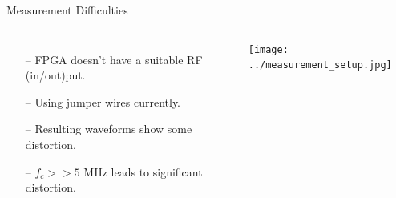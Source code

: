 \documentclass{beamer}
\begin{document}
\begin{frame}{Measurement Difficulties}
\vspace*{-5mm}
\begin{columns}
	\begin{itemize}
		\item[--]
			FPGA doesn't have a suitable RF (in/out)put.
		\item[--]
			Using jumper wires currently.
		\item[--]
			Resulting waveforms show some distortion.
		\item[--]
			$f_c>>5\textrm{ MHz}$ leads to significant distortion.
	\end{itemize}
    \texttt{[image: ../measurement\_setup.jpg]}

\end{columns}
\end{frame}
\end{document}
